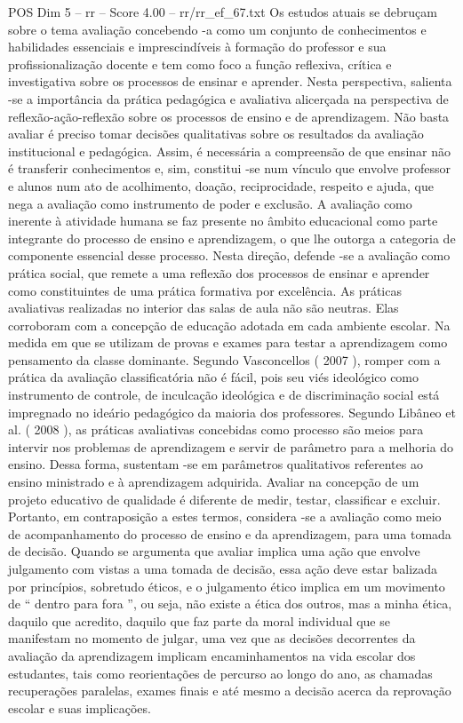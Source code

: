 \begin{textsample}{POS Dim 5 – rr – Score 4.00 – rr/rr\_ef\_67.txt}
Os estudos atuais se debruçam sobre o tema avaliação concebendo -a como um conjunto de conhecimentos e habilidades essenciais e imprescindíveis à formação do professor e sua profissionalização docente e tem como foco a função reflexiva, crítica e investigativa sobre os processos de ensinar e aprender.
Nesta perspectiva, salienta -se a importância da prática pedagógica e avaliativa alicerçada na perspectiva de reflexão-ação-reflexão sobre os processos de ensino e de aprendizagem.
Não basta avaliar é preciso tomar decisões qualitativas sobre os resultados da avaliação institucional e pedagógica.
Assim, é necessária a compreensão de que ensinar não é transferir conhecimentos e, sim, constitui -se num vínculo que envolve professor e alunos num ato de acolhimento, doação, reciprocidade, respeito e ajuda, que nega a avaliação como instrumento de poder e exclusão.
A avaliação como inerente à atividade humana se faz presente no âmbito educacional como parte integrante do processo de ensino e aprendizagem, o que lhe outorga a categoria de componente essencial desse processo.
Nesta direção, defende -se a avaliação como prática social, que remete a uma reflexão dos processos de ensinar e aprender como constituintes de uma prática formativa por excelência.
As práticas avaliativas realizadas no interior das salas de aula não são neutras.
Elas corroboram com a concepção de educação adotada em cada ambiente escolar.
Na medida em que se utilizam de provas e exames para testar a aprendizagem como pensamento da classe dominante.
Segundo Vasconcellos ( 2007 ), romper com a prática da avaliação classificatória não é fácil, pois seu viés ideológico como instrumento de controle, de inculcação ideológica e de discriminação social está impregnado no ideário pedagógico da maioria dos professores.
Segundo Libâneo et al. ( 2008 ), as práticas avaliativas concebidas como processo são meios para intervir nos problemas de aprendizagem e servir de parâmetro para a melhoria do ensino.
Dessa forma, sustentam -se em parâmetros qualitativos referentes ao ensino ministrado e à aprendizagem adquirida.
Avaliar na concepção de um projeto educativo de qualidade é diferente de medir, testar, classificar e excluir.
Portanto, em contraposição a estes termos, considera -se a avaliação como meio de acompanhamento do processo de ensino e da aprendizagem, para uma tomada de decisão.
Quando se argumenta que avaliar implica uma ação que envolve julgamento com vistas a uma tomada de decisão, essa ação deve estar balizada por princípios, sobretudo éticos, e o julgamento ético implica em um movimento de “ dentro para fora ”, ou seja, não existe a ética dos outros, mas a minha ética, daquilo que acredito, daquilo que faz parte da moral individual que se manifestam no momento de julgar, uma vez que as decisões decorrentes da avaliação da aprendizagem implicam encaminhamentos na vida escolar dos estudantes, tais como reorientações de percurso ao longo do ano, as chamadas recuperações paralelas, exames finais e até mesmo a decisão acerca da reprovação escolar e suas implicações.

\end{textsample}
